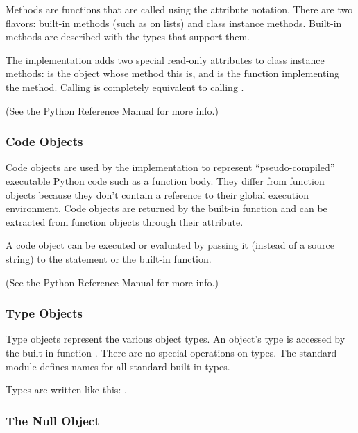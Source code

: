 Methods are functions that are called using the attribute notation.
There are two flavors: built-in methods (such as  on
lists) and class instance methods.  Built-in methods are described
with the types that support them.

The implementation adds two special read-only attributes to class
instance methods:  is the object whose method this
is, and  is the function implementing the method.
Calling  is completely equivalent to calling
.

(See the Python Reference Manual for more info.)

\subsubsection{Code Objects}

Code objects are used by the implementation to represent
``pseudo-compiled'' executable Python code such as a function body.
They differ from function objects because they don't contain a
reference to their global execution environment.  Code objects are
returned by the built-in  function and can be
extracted from function objects through their 
attribute.

A code object can be executed or evaluated by passing it (instead of a
source string) to the  statement or the built-in
 function.

(See the Python Reference Manual for more info.)

\subsubsection{Type Objects}

Type objects represent the various object types.  An object's type is
accessed by the built-in function .  There are no special
operations on types.  The standard module  defines names
for all standard built-in types.

Types are written like this: .

\subsubsection{The Null Object}


